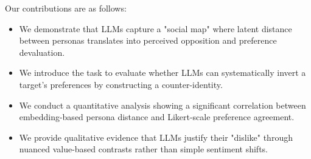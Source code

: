Our contributions are as follows:
\begin{itemize}[leftmargin=*,itemsep=0pt,topsep=0pt]
    \item We demonstrate that LLMs capture a "social map" where latent distance between personas translates into perceived opposition and preference devaluation.
    \item We introduce the \Schismogenesis task to evaluate whether LLMs can systematically invert a target's preferences by constructing a counter-identity.
    \item We conduct a quantitative analysis showing a significant correlation between embedding-based persona distance and Likert-scale preference agreement.
    \item We provide qualitative evidence that LLMs justify their "dislike" through nuanced value-based contrasts rather than simple sentiment shifts.
\end{itemize}
